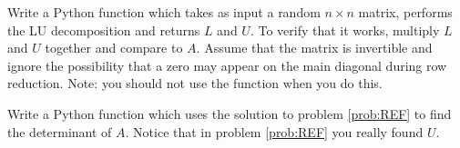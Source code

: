 \begin{problem}
\label{prob:LU}
Write a Python function which takes as input a random $n\times n$ matrix, performs the LU decomposition and returns $L$ and $U$.
To verify that it works, multiply $L$ and $U$ together and compare to $A$.
Assume that the matrix is invertible and ignore the possibility that a zero may appear on the main diagonal during row reduction.
Note: you should not use the  function when you do this.
\end{problem}

\begin{problem}
\label{prob:det}
Write a Python function which uses the solution to problem \ref{prob:REF} to find the determinant of $A$.
Notice that in problem \ref{prob:REF} you really found $U$.
\end{problem}
